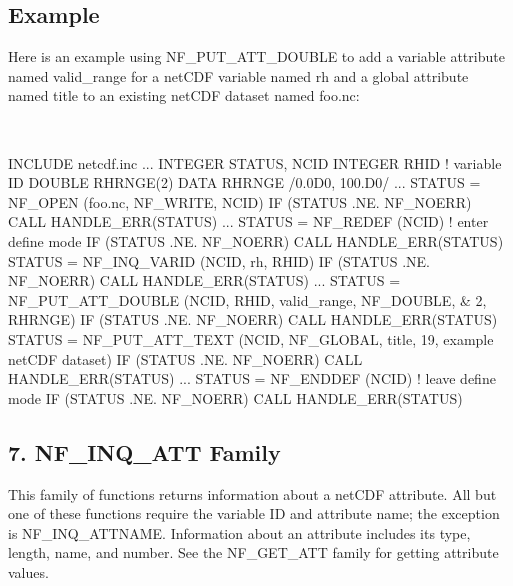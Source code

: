 \subsection*{Example }

Here is an example using N\+F\+\_\+\+P\+U\+T\+\_\+\+A\+T\+T\+\_\+\+D\+O\+U\+B\+LE to add a variable attribute named valid\+\_\+range for a net\+C\+DF variable named rh and a global attribute named title to an existing net\+C\+DF dataset named foo.\+nc\+:

 

I\+N\+C\+L\+U\+DE \textquotesingle{}netcdf.\+inc\textquotesingle{} ... I\+N\+T\+E\+G\+ER S\+T\+A\+T\+US, N\+C\+ID I\+N\+T\+E\+G\+ER R\+H\+ID ! variable ID D\+O\+U\+B\+LE R\+H\+R\+N\+G\+E(2) D\+A\+TA R\+H\+R\+N\+GE /0.0\+D0, 100.\+D0/ ... S\+T\+A\+T\+US = N\+F\+\_\+\+O\+P\+EN (\textquotesingle{}foo.\+nc\textquotesingle{}, N\+F\+\_\+\+W\+R\+I\+TE, N\+C\+ID) IF (S\+T\+A\+T\+US .NE. N\+F\+\_\+\+N\+O\+E\+RR) C\+A\+LL H\+A\+N\+D\+L\+E\+\_\+\+E\+R\+R(\+S\+T\+A\+T\+U\+S) ... S\+T\+A\+T\+US = N\+F\+\_\+\+R\+E\+D\+EF (N\+C\+ID) ! enter define mode IF (S\+T\+A\+T\+US .NE. N\+F\+\_\+\+N\+O\+E\+RR) C\+A\+LL H\+A\+N\+D\+L\+E\+\_\+\+E\+R\+R(\+S\+T\+A\+T\+U\+S) S\+T\+A\+T\+US = N\+F\+\_\+\+I\+N\+Q\+\_\+\+V\+A\+R\+ID (N\+C\+ID, \textquotesingle{}rh\textquotesingle{}, R\+H\+ID) IF (S\+T\+A\+T\+US .NE. N\+F\+\_\+\+N\+O\+E\+RR) C\+A\+LL H\+A\+N\+D\+L\+E\+\_\+\+E\+R\+R(\+S\+T\+A\+T\+U\+S) ... S\+T\+A\+T\+US = N\+F\+\_\+\+P\+U\+T\+\_\+\+A\+T\+T\+\_\+\+D\+O\+U\+B\+LE (N\+C\+ID, R\+H\+ID, \textquotesingle{}valid\+\_\+range\textquotesingle{}, N\+F\+\_\+\+D\+O\+U\+B\+LE, \& 2, R\+H\+R\+N\+GE) IF (S\+T\+A\+T\+US .NE. N\+F\+\_\+\+N\+O\+E\+RR) C\+A\+LL H\+A\+N\+D\+L\+E\+\_\+\+E\+R\+R(\+S\+T\+A\+T\+U\+S) S\+T\+A\+T\+US = N\+F\+\_\+\+P\+U\+T\+\_\+\+A\+T\+T\+\_\+\+T\+E\+XT (N\+C\+ID, N\+F\+\_\+\+G\+L\+O\+B\+AL, \textquotesingle{}title\textquotesingle{}, 19, \textquotesingle{}example net\+C\+DF dataset\textquotesingle{}) IF (S\+T\+A\+T\+US .NE. N\+F\+\_\+\+N\+O\+E\+RR) C\+A\+LL H\+A\+N\+D\+L\+E\+\_\+\+E\+R\+R(\+S\+T\+A\+T\+U\+S) ... S\+T\+A\+T\+US = N\+F\+\_\+\+E\+N\+D\+D\+EF (N\+C\+ID) ! leave define mode IF (S\+T\+A\+T\+US .NE. N\+F\+\_\+\+N\+O\+E\+RR) C\+A\+LL H\+A\+N\+D\+L\+E\+\_\+\+E\+R\+R(\+S\+T\+A\+T\+U\+S)

\subsection*{7. N\+F\+\_\+\+I\+N\+Q\+\_\+\+A\+TT Family }

This family of functions returns information about a net\+C\+DF attribute. All but one of these functions require the variable ID and attribute name; the exception is N\+F\+\_\+\+I\+N\+Q\+\_\+\+A\+T\+T\+N\+A\+ME. Information about an attribute includes its type, length, name, and number. See the N\+F\+\_\+\+G\+E\+T\+\_\+\+A\+TT family for getting attribute values.


